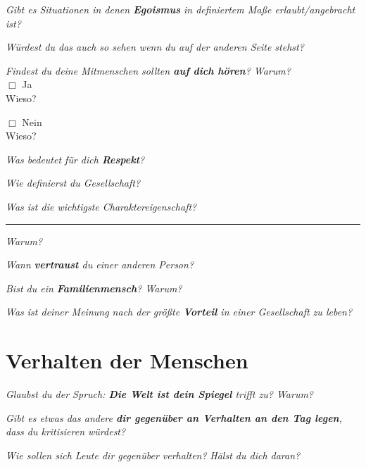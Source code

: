 \documentclass[a4paper,12pt]{scrartcl}
\newcommand{\checkbox}{\(\Box\)}
\newcommand{\hfilloutline}[1]{\rule{#1}{0.5pt}}
\newcommand{\frage}[1]{\textit{#1}}
\renewcommand{\emph}[1]{\textbf{#1}}
\begin{document}
\frage{Gibt es Situationen in denen \emph{Egoismus} in definiertem Maße erlaubt/angebracht ist?}
\vspace{3cm}

\frage{Würdest du das auch so sehen wenn du auf der anderen Seite stehst?}
\vspace{3cm}

\frage{Findest du deine Mitmenschen sollten \emph{auf dich hören}? Warum?} \\ 
\checkbox{} Ja\\
Wieso?\\
\vspace{1cm}

\checkbox{} Nein\\ 
Wieso?\\
\vspace{1cm}

\frage{Was bedeutet für dich \emph{Respekt}?}
\vspace{3cm}

\frage{Wie definierst du Gesellschaft?}
\vspace{3cm}

\frage{Was ist die wichtigste Charaktereigenschaft?} \hfill\hfilloutline{7.5cm}
\frage{Warum?}
\vspace{2cm}

\newpage
\frage{Wann \emph{vertraust} du einer anderen Person?}
\vspace{3cm}


\frage{Bist du ein \emph{Familienmensch}? Warum?}
\vspace{3cm}

\frage{Was ist deiner Meinung nach der größte \emph{Vorteil} in einer Gesellschaft zu leben?}
\vspace{3cm}




\newpage
\section*{Verhalten der Menschen}

\frage{Glaubst du der Spruch: \emph{Die Welt ist dein Spiegel} trifft zu? Warum?}
\vspace{3cm}

\frage{Gibt es etwas das andere \emph{dir gegenüber an Verhalten an den Tag legen}, dass du kritisieren würdest?}
\vspace{3cm}

\frage{Wie sollen sich Leute dir gegenüber verhalten?}
\frage{Hälst du dich daran?}
\vspace{2cm}
\end{document}
